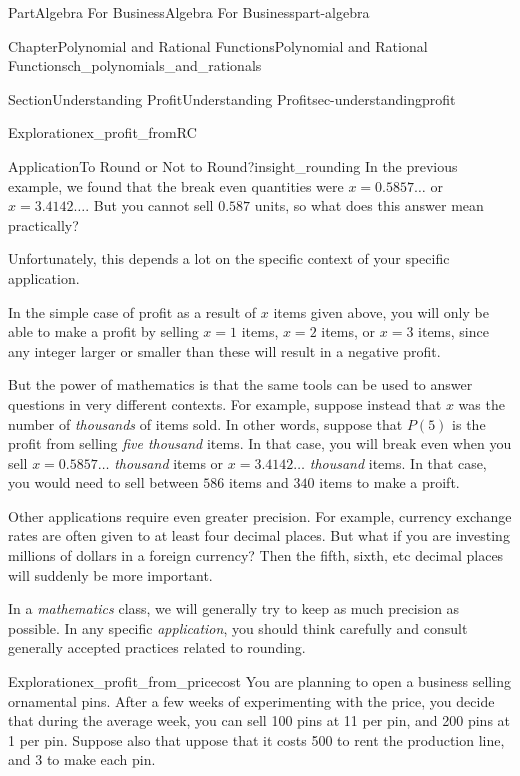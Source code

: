 \documentclass[oneside,10pt,]{tufte-book}
\numberwithin{equation}{chapter}
\begin{document}
\begin{partptx}{Part}{Algebra For Business}{}{Algebra For Business}{}{}{part-algebra}
\begin{chapterptx}{Chapter}{Polynomial and Rational Functions}{}{Polynomial and Rational Functions}{}{}{ch_polynomials_and_rationals}
\begin{sectionptx}{Section}{Understanding Profit}{}{Understanding Profit}{}{}{sec-understandingprofit}
\begin{exploration}{Exploration}{}{ex_profit_fromRC}
\begin{enumerate}[font=\bfseries,label=(\alph*),ref=\alph*]
\begin{image}{0.25}{0.5}{0.25}{}
{
}%
\end{image}%
\end{enumerate}%
\end{exploration}%
\begin{insight}{Application}{To Round or Not to Round?}{insight_rounding}%
In the previous example, we found that the break even quantities were  \(x=0.5857\dots\) or \(x=3.4142\dots\).  But you cannot sell \(0.587\) units, so what does this answer mean practically?%
\par
Unfortunately, this depends a lot on the specific context of your specific application.%
\par
In the simple case of \textdollar{} profit as a result of \(x\) items given above, you will only be able to make a profit by selling \(x=1\) items, \(x=2\) items, or \(x=3\) items, since any integer larger or smaller than these will result in a negative profit.%
\par
But the power of mathematics is that the same tools can be used to answer questions in very different contexts.  For example, suppose instead that \(x\) was the number of \emph{thousands} of items sold.  In other words, suppose that \(P(5)\) is the profit from selling \emph{five thousand} items.  In that case, you will break even when you sell \(x=0.5857\dots\) \emph{thousand} items or \(x=3.4142\dots\) \emph{thousand} items.  In that case, you would need to sell between \(586\) items and \(340\) items to make a proift.%
\par
Other applications require even greater precision.  For example, currency exchange rates are often given to at least four decimal places.  But what if you are investing millions of dollars in a foreign currency?  Then the fifth, sixth, etc decimal places will suddenly be more important.%
\par
In a \emph{mathematics} class, we will generally try to keep as much precision as possible.  In any specific \emph{application}, you should think carefully and consult generally accepted practices related to rounding.%
\end{insight}
\begin{exploration}{Exploration}{}{ex_profit_from_pricecost}%
You are planning to open a business selling ornamental pins. After a few weeks of experimenting with the price, you decide that during the average week, you can sell 100 pins at \textdollar{}11 per pin, and 200 pins at \textdollar{}1 per pin. Suppose also that uppose that it costs \textdollar{}500 to rent the production line, and \textdollar{}3 to make each pin.%

\end{exploration}
\end{sectionptx}
\end{chapterptx}
\end{partptx}
\end{document}
